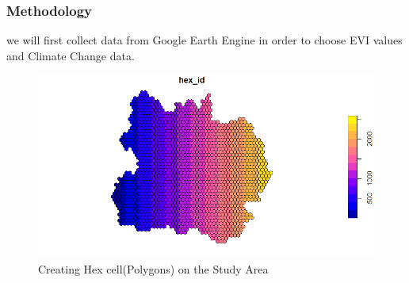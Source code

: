 \documentclass[11pt]{beamer}
\begin{document}
\begin{frame}
	\frametitle{Methodology}
we will first collect data from Google Earth Engine in order to choose  EVI values and Climate Change data.
\begin{figure}
	\centering
	\includegraphics[width=0.7\linewidth]{images/Rplot}
	\caption{Creating Hex cell(Polygons) on the Study Area}
	\label{fig:rplot}
\end{figure}
\end{frame}
\end{document}
